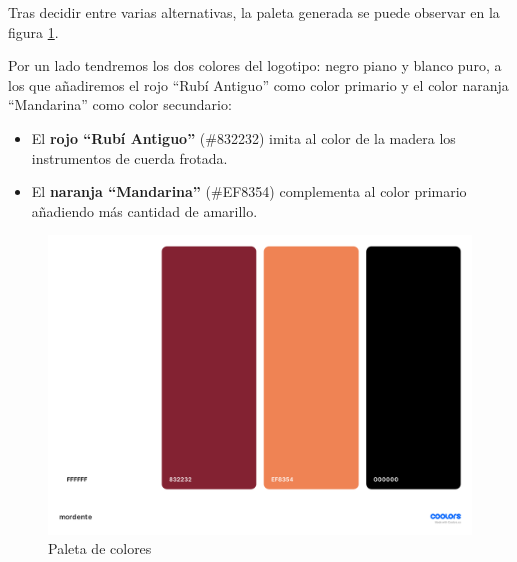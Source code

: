 Tras decidir entre varias alternativas, la paleta generada se puede observar en la figura \ref{fig:paletaMordente}.

Por un lado tendremos los dos colores del logotipo: negro piano y blanco puro, a los que añadiremos el rojo ``Rubí Antiguo'' como color primario y el color naranja ``Mandarina'' como color secundario:

\begin{itemize}
    \item El \textbf{rojo ``Rubí Antiguo''} (\#832232) imita al color de la madera los instrumentos de cuerda frotada.
    \item El \textbf{naranja ``Mandarina''} (\#EF8354) complementa al color primario añadiendo más cantidad de amarillo.
\end{itemize}



\begin{figure}[h]
\centering
\includegraphics[width=\textwidth]{imagenes/disenyo_interfaz/mordente_paleta.pdf}
\caption{Paleta de colores}
\label{fig:paletaMordente}
\end{figure}
